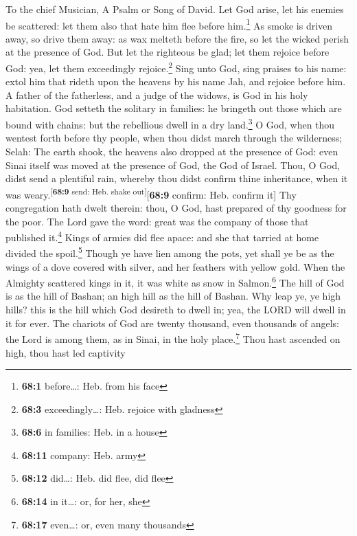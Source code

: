 To the chief Musician, A Psalm or Song of David.  Let God
arise, let his enemies be scattered: let them also that hate him flee
before him.\footnote{\textbf{68:1} before\ldots: Heb. from his face}
 As smoke is driven away, so drive them away: as wax
melteth before the fire, so let the wicked perish at the presence of
God.  But let the righteous be glad; let them rejoice
before God: yea, let them exceedingly rejoice.\footnote{\textbf{68:3}
  exceedingly\ldots: Heb. rejoice with gladness}  Sing
unto God, sing praises to his name: extol him that rideth upon the
heavens by his name Jah, and rejoice before him.  A father
of the fatherless, and a judge of the widows, is God in his holy
habitation.  God setteth the solitary in families: he
bringeth out those which are bound with chains: but the rebellious dwell
in a dry land.\footnote{\textbf{68:6} in families: Heb. in a house}
 O God, when thou wentest forth before thy people, when
thou didst march through the wilderness; Selah:  The earth
shook, the heavens also dropped at the presence of God: even Sinai
itself was moved at the presence of God, the God of Israel.
 Thou, O God, didst send a plentiful rain, whereby thou
didst confirm thine inheritance, when it was
weary.\textsuperscript{{[}\textbf{68:9} send: Heb. shake
out{]}}{[}\textbf{68:9} confirm: Heb. confirm it{]}  Thy
congregation hath dwelt therein: thou, O God, hast prepared of thy
goodness for the poor.  The Lord gave the word: great was
the company of those that published it.\footnote{\textbf{68:11} company:
  Heb. army}  Kings of armies did flee apace: and she
that tarried at home divided the spoil.\footnote{\textbf{68:12}
  did\ldots: Heb. did flee, did flee}  Though ye have
lien among the pots, yet shall ye be as the wings of a dove covered with
silver, and her feathers with yellow gold.  When the
Almighty scattered kings in it, it was white as snow in
Salmon.\footnote{\textbf{68:14} in it\ldots: or, for her, she}
 The hill of God is as the hill of Bashan; an high hill
as the hill of Bashan.  Why leap ye, ye high hills? this
is the hill which God desireth to dwell in; yea, the LORD will dwell in
it for ever.  The chariots of God are twenty thousand,
even thousands of angels: the Lord is among them, as in Sinai, in the
holy place.\footnote{\textbf{68:17} even\ldots: or, even many thousands}
 Thou hast ascended on high, thou hast led captivity
